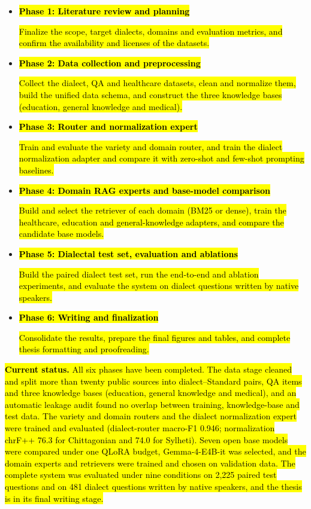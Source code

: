 \begin{itemize}
\item \hl{\textbf{Phase 1: Literature review and planning}}

\hl{Finalize the scope, target dialects, domains and evaluation metrics,
and confirm the availability and licenses of the datasets.}

\item \hl{\textbf{Phase 2: Data collection and preprocessing}}

\hl{Collect the dialect, QA and healthcare datasets, clean and normalize
them, build the unified data schema, and construct the three knowledge
bases (education, general knowledge and medical).}

\item \hl{\textbf{Phase 3: Router and normalization expert}}

\hl{Train and evaluate the variety and domain router, and train the
dialect normalization adapter and compare it with zero-shot and
few-shot prompting baselines.}

\item \hl{\textbf{Phase 4: Domain RAG experts and base-model comparison}}

\hl{Build and select the retriever of each domain (BM25 or dense), train
the healthcare, education and general-knowledge adapters, and compare the
candidate base models.}

\item \hl{\textbf{Phase 5: Dialectal test set, evaluation and ablations}}

\hl{Build the paired dialect test set, run the end-to-end and ablation
experiments, and evaluate the system on dialect questions written by
native speakers.}

\item \hl{\textbf{Phase 6: Writing and finalization}}

\hl{Consolidate the results, prepare the final figures and tables, and
complete thesis formatting and proofreading.}
\end{itemize}

\hl{\textbf{Current status.} All six phases have been completed. The data
stage cleaned and split more than twenty public sources into
dialect--Standard pairs, QA items and three knowledge bases (education,
general knowledge and medical), and an automatic leakage audit found no
overlap between training, knowledge-base and test data. The variety and
domain routers and the dialect normalization expert were trained and
evaluated (dialect-router macro-F1 0.946; normalization chrF++ 76.3 for
Chittagonian and 74.0 for Sylheti). Seven open base models were compared
under one QLoRA budget, Gemma-4-E4B-it was selected, and the domain
experts and retrievers were trained and chosen on validation data. The
complete system was evaluated under nine conditions on 2,225 paired test
questions and on 481 dialect questions written by native speakers, and
the thesis is in its final writing stage.}

